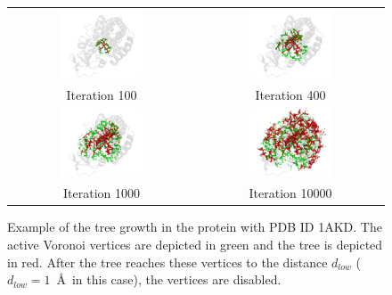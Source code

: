 \documentclass[usletter, 10pt, conference]{svjour3}      %
\def\db{d_{low}}
\begin{document}
\begin{figure}
\centering
{
\renewcommand{\tabcolsep}{1pt}
\begin{tabular}{cc}
\includegraphics[width=0.45\textwidth]{fig/1akd2-0} &
\includegraphics[width=0.45\textwidth]{fig/1akd2-41} \\
Iteration 100 & Iteration 400 \\
\includegraphics[width=0.45\textwidth]{fig/1akd2-102} &
\includegraphics[width=0.45\textwidth]{fig/1akd2-10k} \\
Iteration 1000 & Iteration 10000 \\
\end{tabular}
}
\caption{\label{fig::1akdvv}
    Example of the tree growth in the protein with PDB ID 1AKD.
    The active Voronoi vertices are depicted in green and the tree is depicted in red.
    After the tree reaches these vertices to the distance $\db$ ($\db=1$~\AA\ in this case), the vertices are disabled.
}
\end{figure}
\end{document}
